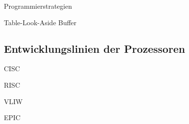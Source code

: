 \begin{defi}{Programmierstrategien}

\end{defi}

\begin{defi}{Table-Look-Aside Buffer}

\end{defi}

\subsection{Entwicklungslinien der Prozessoren}

\begin{defi}{CISC}

\end{defi}

\begin{defi}{RISC}

\end{defi}

\begin{defi}{VLIW}

\end{defi}

\begin{defi}{EPIC}

\end{defi}